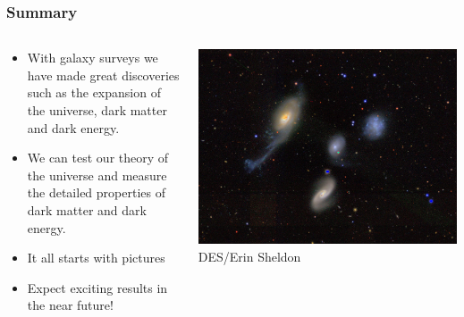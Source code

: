 \documentclass{beamer}
\begin{document}
\frame
{

    \frametitle{Summary}


    \begin{columns}
        \begin{column}{0.5\textwidth}
            \begin{itemize}

                \item With galaxy surveys we have made great
                    discoveries such as the expansion of
                    the universe, dark matter and dark energy.
                    
                \item We can test our theory of the universe and measure the
                    detailed properties of dark matter and dark energy.

                \item It all starts with pictures

                \item Expect exciting results in the near future!

            \end{itemize}

        \end{column}
        \begin{column}{0.5\textwidth}
            \begin{center}
                \includegraphics[width=1.2\textwidth, angle=-90]{DES0022-4831-four.jpg}
                \newline
                {\tiny DES/Erin Sheldon}
            \end{center}
        \end{column}

    \end{columns}


}
\end{document}
